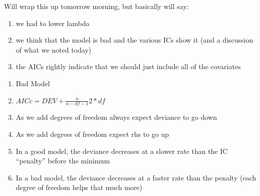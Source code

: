 \documentclass[11pt, fleqn]{article}
\begin{document}
Will wrap this up tomorrow morning, but basically will say:
\begin{enumerate}
  \item we had to lower lambda
  \item we think that the model is bad and the various ICs show it (and a discussion of what we noted today)
  \item the AICs rightly indicate that we should just include all of the covariates
\end{enumerate}

\begin{enumerate}
  \item Bad Model
  \item $AICc = DEV + \frac{n}{n-df-1}2*df$
  \item As we add degrees of freedom always expect deviance to go down
  \item As we add degress of freedom expect rhs to go up
  \item In a good model, the deviance decreases at a slower rate than the IC ``penalty'' before the minimum
  \item In a bad model, the deviance decreases at a faster rate than the penalty (each degree of freedom helps that much more)
\end{enumerate}
\end{document}
